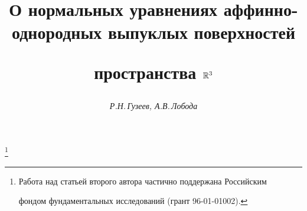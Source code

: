 




%





\newcommand{\tts}[1]{}









\setcounter{page}{25}















\author{\it Р.Н.\,Гузеев, А.В.\,Лобода}




\title{О нормальных уравнениях аффинно-однородных выпуклых поверхностей


пространства $\Bbb R^3$}


\thanks{Работа над статьей второго автора частично поддержана Российским


фондом фундаментальных исследований (грант 96-01-01002).}





\date{}




\pagestyle{plain} %







\maketitle


